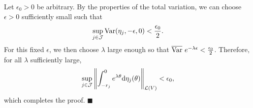 \documentclass[onecolumn]{autart}
\numberwithin{equation}{section}
\newenvironment{proof}{{\it Proof: \enspace}}{\hfill $\blacksquare$\par}
\begin{document}
\begin{proof}
		Let $\epsilon_0 > 0$ be arbitrary. By the properties of the total variation, we can choose $ \epsilon > 0 $ sufficiently small such that $$ \sup_{j \in \mathcal{J}} {\rm Var} (\eta_j, -\epsilon, 0) < \frac{\epsilon_0}{2}. $$  For this fixed $ \epsilon$, we then choose $ \lambda $ large enough so that $ \overline{{\rm Var}} \ e^{-\lambda \epsilon} < \frac{\epsilon_0}{2}$. Therefore, for all $ \lambda $ sufficiently large,
		 \begin{align*}
		 \sup_{j \in \mathcal{J}} \left\| \int_{-r_j}^{0} e^{\lambda \theta} {\rm d}\eta_j(\theta) \right\|_{\mathcal{L}(V)} < \epsilon_0,
		 \end{align*}
		which completes the proof.
	\end{proof}
	
	
	
	
	
	
	
\end{document}
